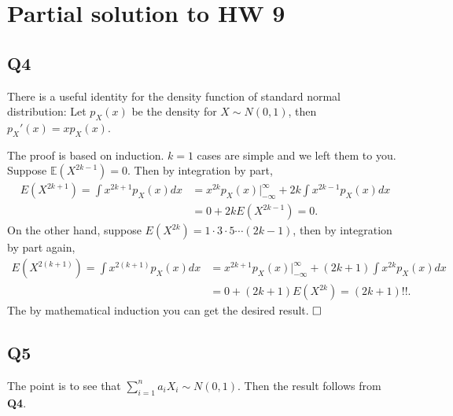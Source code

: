 \documentclass[12pt]{article}
\begin{document}
\newcommand*{\horzbar}{\rule[.5ex]{2.5ex}{0.5pt}}

\section*{Partial solution to HW 9}
\subsection*{Q4}
There is a useful identity for the density function of standard normal distribution: Let $p_X(x)$ be the density for $X\sim N(0,1)$, then $p_X'(x)=xp_X(x)$.

The proof is based on induction. $k=1$ cases are simple and we left them to you. Suppose $\mathbb{E}(X^{2k-1})=0$. Then by integration by part,
\begin{equation*}
\begin{aligned}
E(X^{2k+1})=\int x^{2k+1}p_X(x)dx &= x^{2k}p_X(x)\Big|^\infty_{-\infty}+2k\int x^{2k-1}p_X(x)dx
\\&
=0+2kE(X^{2k-1})=0.
\end{aligned}
\end{equation*}
On the other hand, suppose $E(X^{2k})=1\cdot 3\cdot 5\cdots(2k-1)$, then by integration by part again,
\begin{equation*}
\begin{aligned}
E(X^{2(k+1)})=\int x^{2(k+1)}p_X(x)dx &= x^{2k+1}p_X(x)\Big|^\infty_{-\infty}+(2k+1)\int x^{2k}p_X(x)dx
\\&
=0+(2k+1)E(X^{2k})=(2k+1)!!.
\end{aligned}
\end{equation*}
The by mathematical induction you can get the desired result.
$\hspace{\fill}\square$

\subsection*{Q5}
The point is to see that $\sum_{i=1}^na_iX_i\sim N(0,1)$. Then the result follows from \textbf{Q4}.
\end{document}
